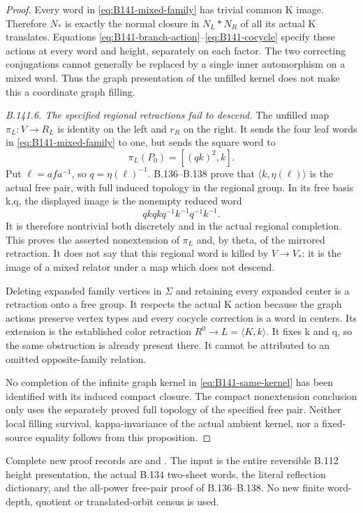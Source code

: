 \begin{proof}
Every word in \eqref{eq:B141-mixed-family} has trivial common
K image. Therefore $N_*$ is exactly the normal closure in
$N_L*N_R$ of all its actual K translates. Equations
\eqref{eq:B141-branch-action}--\eqref{eq:B141-cocycle} specify these
actions at every word and height, separately on each factor.
The two correcting conjugations cannot generally be replaced
by a single inner automorphism on a mixed word. Thus the graph
presentation of the unfilled kernel does not make this a coordinate
graph filling.

\emph{B.141.6. The specified regional retractions fail to descend.}
The unfilled map $\pi_L:V\to R_L$ is identity on the left and
$r_R$ on the right. It sends the four leaf words in
\eqref{eq:B141-mixed-family} to one, but sends the square word to
\[
\pi_L(P_0)=[(qk)^2,k].
\]
Put $\ell=afa^{-1}$, so $q=\eta(\ell)^{-1}$.
B.136--B.138 prove that $\langle k,\eta(\ell)\rangle$ is
the actual free pair, with full induced topology in the regional
group. In its free basis k,q, the displayed image is the
nonempty reduced word
\[
qkqkq^{-1}k^{-1}q^{-1}k^{-1}.
\]
It is therefore nontrivial both discretely and in the actual
regional completion. This proves the asserted nonextension of
$\pi_L$ and, by theta, of the mirrored retraction.
It does not say that this regional word is killed by $V\to V_*$:
it is the image of a mixed relator under a map which does not descend.

Deleting expanded family vertices in $\Sigma$ and retaining every
expanded center is a retraction onto a free group. It respects the
actual K action because the graph actions preserve vertex types and
every cocycle correction is a word in centers. Its extension is
the established color retraction $R^0\to L=\langle K,k\rangle$.
It fixes k and q, so the same obstruction is already present there.
It cannot be attributed to an omitted opposite-family relation.

No completion of the infinite graph kernel in
\eqref{eq:B141-same-kernel} has been identified with its induced
compact closure. The compact nonextension conclusion only uses the
separately proved full topology of the specified free pair. Neither
local filling survival, kappa-invariance of the actual ambient kernel,
nor a fixed-source equality follows from this proposition.
\end{proof}

\begingroup\raggedright\footnotesize
Complete new proof records are
and .
The input is the entire reversible B.112 height presentation,
the actual B.134 two-sheet words, the literal reflection dictionary,
and the all-power free-pair proof of B.136--B.138. No new finite
word-depth, quotient or translated-orbit census is used.
\par\endgroup
